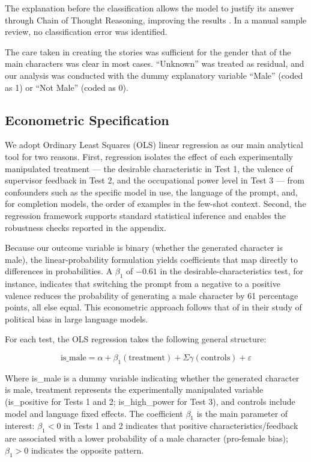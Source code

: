 \documentclass[12pt,a4paper]{article}
\begin{document}
The explanation before the classification allows the model to justify its
answer through Chain of Thought Reasoning, improving the
results \citep{yugeswardeenoo2024}. In a manual sample review,
no classification error was identified.

The care taken in creating the stories was sufficient for the gender
that of the main characters was clear in most cases. ``Unknown''
was treated as residual, and our analysis was conducted with the dummy
explanatory variable ``Male'' (coded as 1) or ``Not Male''
(coded as 0).


\subsection{Econometric Specification}\label{sec:econometric-specification}


We adopt Ordinary Least Squares (OLS) linear regression as our main analytical
tool for two reasons. First, regression isolates the effect of each
experimentally manipulated treatment --- the desirable characteristic in Test
1, the valence of supervisor feedback in Test 2, and the occupational power
level in Test 3 --- from confounders such as the specific model in use, the
language of the prompt, and, for completion models, the order of examples in
the few-shot context. Second, the regression framework supports standard
statistical inference and enables the robustness checks reported in the
appendix.

Because our outcome variable is binary (whether the generated character is
male), the linear-probability formulation yields coefficients that map directly
to differences in probabilities. A $\beta_1$ of $-0.61$ in the
desirable-characteristics test, for instance, indicates that switching the
prompt from a negative to a positive valence reduces the probability of
generating a male character by 61 percentage points, all else equal. This
econometric approach follows that of \citet{motoki2024} in their study of
political bias in large language models.

For each test, the OLS regression takes the following general structure:

\begin{equation}
\text{is\_male} = \alpha + \beta_1(\text{treatment}) + \Sigma\gamma(\text{controls}) + \varepsilon
\end{equation}

Where is\_male is a dummy variable indicating whether the generated character is
male, treatment represents the experimentally manipulated variable
(is\_positive for Tests 1 and 2; is\_high\_power for Test 3), and
controls include model and language fixed effects. The coefficient $\beta_1$ is the
main parameter of interest: $\beta_1 < 0$ in Tests 1 and 2 indicates that
positive characteristics/feedback are associated with a lower
probability of a male character (pro-female bias); $\beta_1 > 0$
indicates the opposite pattern.
\end{document}
